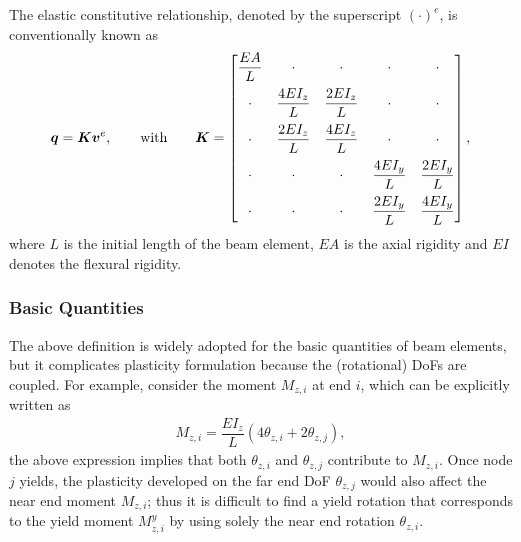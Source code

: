The elastic constitutive relationship, denoted by the superscript $\left(\cdot\right)^e$, is conventionally known as
\begin{gather}
\bm{q}=\bm{K}\bm{v}^e,\qquad\text{with}\qquad\bm{K}=\begin{bmatrix}
\dfrac{EA}{L}&\cdot&\cdot&\cdot&\cdot\\[3mm]
\cdot&\dfrac{4EI_z}{L}&\dfrac{2EI_z}{L}&\cdot&\cdot\\[3mm]
\cdot&\dfrac{2EI_z}{L}&\dfrac{4EI_z}{L}&\cdot&\cdot\\[3mm]
\cdot&\cdot&\cdot&\dfrac{4EI_y}{L}&\dfrac{2EI_y}{L}\\[3mm]
\cdot&\cdot&\cdot&\dfrac{2EI_y}{L}&\dfrac{4EI_y}{L}
\end{bmatrix},
\end{gather}
where $L$ is the initial length of the beam element, $EA$ is the axial rigidity and $EI$ denotes the flexural rigidity.
\subsubsection{Basic Quantities}
The above definition is widely adopted for the basic quantities of beam elements, but it complicates plasticity formulation because the (rotational) DoFs are coupled.
For example, consider the moment $M_{z,i}$ at end $i$, which can be explicitly written as
\begin{gather}\label{eq:redefine}
M_{z,i}=\dfrac{EI_z}{L}\left(4\theta_{z,i}+2\theta_{z,j}\right),
\end{gather}
the above expression implies that both $\theta_{z,i}$ and $\theta_{z,j}$ contribute to $M_{z,i}$.
Once node $j$ yields, the plasticity developed on the far end DoF $\theta_{z,j}$ would also affect the near end moment $M_{z,i}$; thus it is difficult to find a yield rotation that corresponds to the yield moment $M^y_{z,i}$ by using solely the near end rotation $\theta_{z,i}$.

